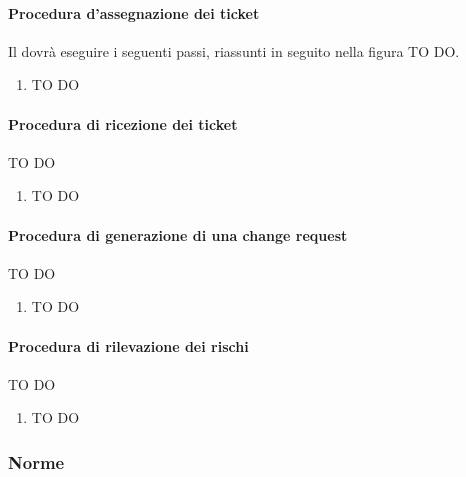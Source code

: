 			\paragraph{Procedura d'assegnazione dei ticket}
			Il \roleProjectManager{} dovrà eseguire i seguenti passi, riassunti in seguito nella figura TO DO.
				\begin{enumerate}
					\item TO DO
				\end{enumerate}
			
			\paragraph{Procedura di ricezione dei ticket}
			TO DO
				\begin{enumerate}
					\item TO DO
				\end{enumerate}
			\paragraph{Procedura di generazione di una change request}
			TO DO
				\begin{enumerate}
					\item TO DO
				\end{enumerate}
			\paragraph{Procedura di rilevazione dei rischi}
			TO DO
				\begin{enumerate}
					\item TO DO
				\end{enumerate}
				
		\subsubsection{Norme}

